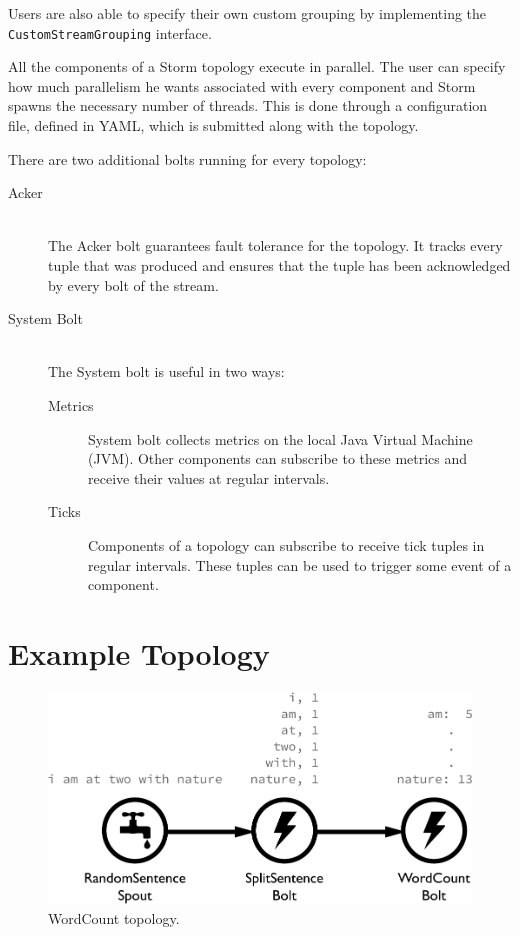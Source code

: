Users are also able to specify their own custom grouping by implementing the \texttt{CustomStreamGrouping} interface.


All the components of a Storm topology execute in parallel. The user can specify how much parallelism he wants associated with every component and Storm spawns the necessary number of threads. This is done through a configuration file, defined in YAML, which is submitted along with the topology.

There are two additional bolts running for every topology:

\begin{description}
	\item[Acker] \hfill \\
	The Acker bolt guarantees fault tolerance for the topology. It tracks every tuple that was produced and ensures that the tuple has been acknowledged by every bolt of the stream.
	\item[System Bolt] \hfill \\
	The System bolt is useful in two ways:
	\begin{description}
		\item[Metrics] System bolt collects metrics on the local Java Virtual Machine (JVM). Other components can subscribe to these metrics and receive their values at  regular intervals.
		\item[Ticks] Components of a topology can subscribe to receive tick tuples in regular intervals. These tuples can be used to trigger some event of a component.
	\end{description}
\end{description}

\section{Example Topology}
\label{sec:example_topology}

\begin{figure}[!htb]
	\centering
	\includegraphics[scale=0.7]{pdf/wordcount_topology.pdf}
	\caption{WordCount topology.}
	\label{fig:wordcount_topology}
\end{figure}


